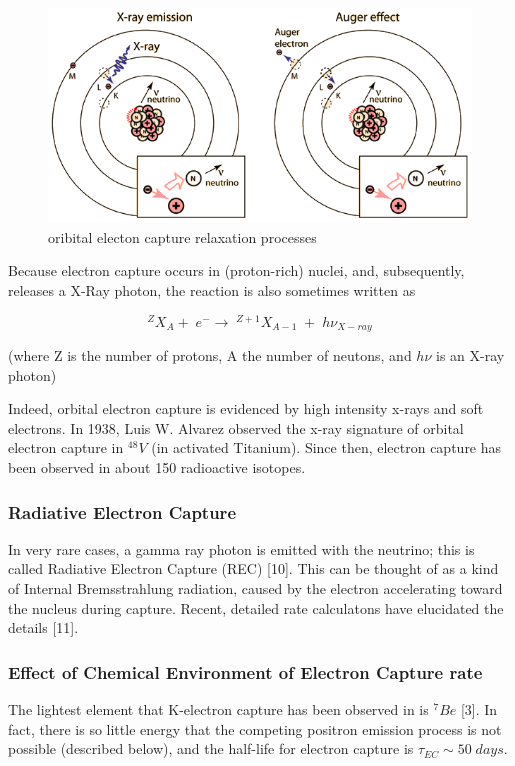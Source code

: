 \documentclass[11pt]{amsart}
\begin{document}
\begin{figure}
   \includegraphics[scale=0.5]{img/ecrelax.png}
   \caption{oribital electon capture relaxation processes}
  \label{fig:ec1}
\end{figure}

Because electron capture occurs in (proton-rich) nuclei, and, subsequently, releases a X-Ray photon, the reaction is also sometimes written as

$$^{Z}X_{A}+\;e^{-}\rightarrow\;^{Z+1}X_{A-1}\;+\;h\nu_{X-ray}$$

(where Z is the number of protons, A the number of neutons, and $h\nu$ is an X-ray photon)

Indeed, orbital electron capture is evidenced by high intensity  x-rays and soft electrons.  In 1938, Luis W. Alvarez observed the x-ray signature of orbital electron capture in $^{48}V$ (in activated Titanium). Since then, electron capture has been observed in about 150 radioactive isotopes.


\subsubsection{Radiative Electron Capture}

In very rare cases, a gamma ray photon is emitted with the neutrino; this is called Radiative Electron Capture (REC) [10]. This can be thought of as a kind of Internal Bremsstrahlung radiation, caused by the electron accelerating toward the nucleus during capture. Recent, detailed rate calculatons have elucidated the details [11].

\subsubsection{Effect of Chemical Environment of Electron Capture rate} 
The lightest element that K-electron capture has been observed in is $^{7}Be$ [3]. In fact, there is so little energy that the competing positron emission process is not possible (described below), and the half-life for electron capture is $\tau_{EC}\sim 50\;days$.
\end{document}
